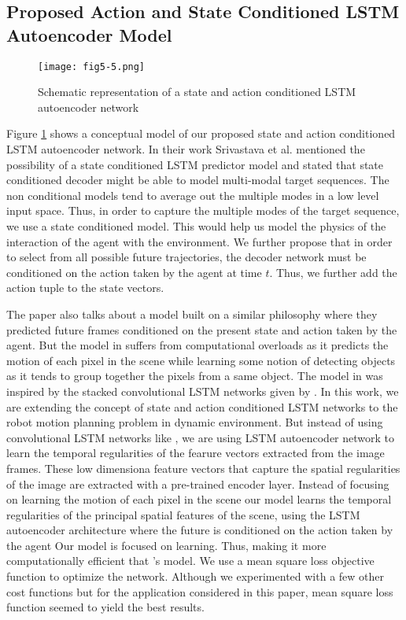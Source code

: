 \documentclass[sigconf]{acmart}
\begin{document}
\subsection{Proposed Action and State Conditioned LSTM Autoencoder Model}\begin{figure}
    \centering
    \texttt{[image: fig5-5.png]}
    \caption{Schematic representation of a state and action conditioned LSTM autoencoder network}
    \label{fig4}
\end{figure}
Figure \ref{fig4} shows a conceptual model of our proposed state and action conditioned LSTM autoencoder network.  In their work  Srivastava et al. \cite{srivastava} mentioned the possibility of a  state conditioned LSTM predictor model and stated that state conditioned decoder might be able to model multi-modal target sequences. The non conditional models tend to average out the multiple modes in a low level input space. Thus, in order to capture the multiple modes of the target sequence, we use a  state conditioned model. This would help us model the physics of the interaction of the agent with the environment. We further propose that in order to select from all possible future trajectories, the decoder network must be conditioned on the action taken by the agent at time $t$. Thus, we further add the action tuple to the state vectors.


The paper \cite{finn} also talks about a model built on a similar philosophy where they predicted future frames conditioned on the present state and action taken by the agent. But the model in \cite{finn} suffers from computational overloads as it predicts the motion of each pixel in the scene while learning some notion of detecting objects as it tends to group together the pixels from a same object.  The model in \cite{finn} was inspired by the stacked convolutional LSTM networks given by \cite{xing}. In this work, we are extending the concept of state and action conditioned LSTM networks to the robot motion planning problem in dynamic environment. But instead of using convolutional LSTM networks like \cite{finn}, we are using LSTM autoencoder network to learn the temporal regularities of the fearure vectors extracted from the image frames. These low dimensiona feature vectors that capture the spatial regularities of the image are extracted  with a pre-trained encoder layer. Instead of focusing on learning the motion of each pixel in the scene our model learns the temporal regularities of the principal spatial features of the scene, using the LSTM autoencoder architecture where the future is conditioned on the action taken by the agent Our model is focused on learning. Thus, making it more computationally efficient that \cite{finn}'s model. We use a mean square loss objective function to optimize the network. Although we experimented with a few other  cost functions but for the application considered in this paper, mean square loss function seemed to yield the best results.
\end{document}
